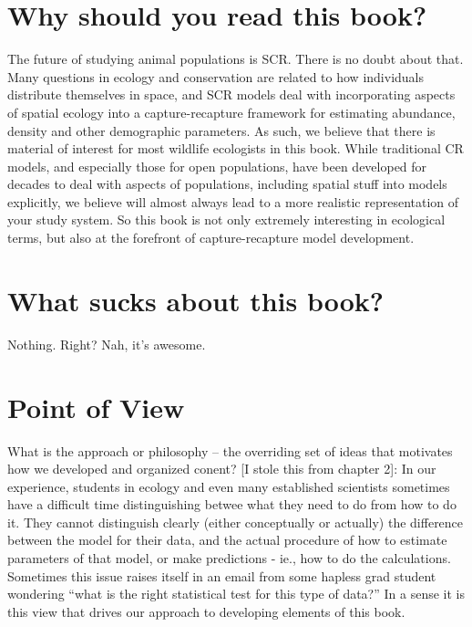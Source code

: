 \section*{Why should you read this book?}

The future of studying animal populations is SCR. There is no doubt
about that. Many questions in ecology and conservation are related to how individuals distribute themselves in space, and SCR models deal with incorporating aspects of spatial ecology into a capture-recapture framework for estimating abundance, density and other demographic parameters. As such, we believe that there is material of interest for most wildlife ecologists in this book. While traditional CR models, and especially those for open populations, have been developed for decades to deal with aspects of populations, including spatial stuff into models explicitly, we believe will almost always lead to a more realistic representation of your study system.  So this book is not only extremely interesting in ecological terms, but also at the forefront of capture-recapture model development.

\section{What sucks about this book?}

Nothing. Right?
Nah, it's awesome. 



\section*{Point of View}

What is the approach or philosophy -- the overriding set of ideas that
motivates how we developed and organized conent?
[I stole this from chapter 2]:
In our experience, students in ecology and even many established
scientists sometimes have a difficult time distinguishing
betwee what they need to do  from how to do
it.  They cannot distinguish clearly (either conceptually or actually)
the difference between the model for their data, and the actual
procedure of how to estimate parameters of that model, or make
predictions - ie., how to do the calculations. Sometimes this issue
raises itself in an email from some hapless grad student wondering
``what is the right statistical test for this type of data?''  In a
sense it is this view that drives our approach to developing elements
of this book.

